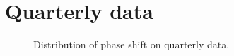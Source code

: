 \documentclass[
]{article}
\newcommand\1{\mathds{1}}
\begin{document}
\newpage

\section{Quarterly data}\label{quarterly-data}

\begin{figure}

\caption{\label{fig-graphs-quarterly}Distribution of phase shift on
quarterly data.}


\end{figure}%
\end{document}
